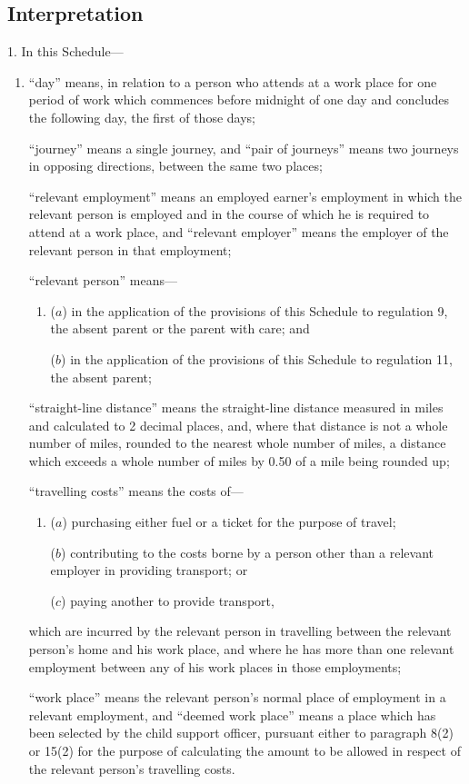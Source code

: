\documentclass[12pt,a4paper]{article}
\begin{document}
\renewcommand\parthead{--- Schedule 3B}


\subsection*{Interpretation}

1.  In this Schedule—
\begin{enumerate}\item[]
“day” means, in relation to a person who attends at a work place for one period of work which commences before midnight of one day and concludes the following day, the first of those days;

“journey” means a single journey, and “pair of journeys” means two journeys in opposing directions, between the same two places;

“relevant employment” means an employed earner’s employment in which the relevant person is employed and in the course of which he is required to attend at a work place, and “relevant employer” means the employer of the relevant person in that employment;

“relevant person” means—
\begin{enumerate}\item[]
($a$) in the application of the provisions of this Schedule to regulation 9, the absent parent or the parent with care; and

($b$) in the application of the provisions of this Schedule to regulation 11, the absent parent;
\end{enumerate}

“straight-line distance” means the straight-line distance measured in miles and calculated to 2 decimal places, and, where that distance is not a whole number of miles, rounded to the nearest whole number of miles, a distance which exceeds a whole number of miles by 0.50 of a mile being rounded up;

“travelling costs” means the costs of—
\begin{enumerate}\item[]
($a$) purchasing either fuel or a ticket for the purpose of travel;

($b$) contributing to the costs borne by a person other than a relevant employer in providing transport; or

($c$) paying another to provide transport,
\end{enumerate}
which are incurred by the relevant person in travelling between the relevant person’s home and his work place, and where he has more than one relevant employment between any of his work places in those employments;

“work place” means the relevant person’s normal place of employment in a relevant employment, and “deemed work place” means a place which has been selected by the child support officer, pursuant either to paragraph 8(2) or 15(2) for the purpose of calculating the amount to be allowed in respect of the relevant person’s travelling costs.
\end{enumerate}
\end{document}
